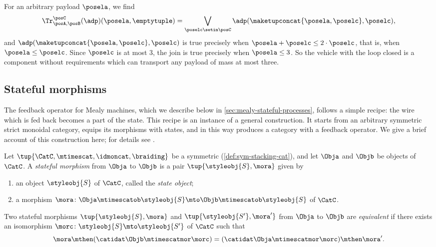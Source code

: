 \begin{example}
    For an arbitrary payload $\posela$, we find
    \begin{equation}
        \Tr_{\posA,\posB}^{\posC}(\adp)(\posela, \emptytuple)
        = \bigvee_{\poselc \setin \posC} \adp(\maketupconcat{\posela, \poselc}, \poselc),
    \end{equation}
    and $\adp(\maketupconcat{\posela, \poselc}, \poselc)$ is true precisely when $\posela + \poselc \leq 2 \cdot \poselc$, that is, when $\posela \leq \poselc$.
    Since $\poselc$ is at most $3$, the join is true precisely when $\posela \leq 3$.
    So the vehicle with the loop closed is a component without requirements which can transport any payload of mass at most three.
\end{example}


\subsection{Stateful morphisms}
\label{sec:stateful-processes}

The feedback operator for Mealy machines, which we describe below in \cref{sec:mealy-stateful-processes}, follows a simple recipe: the wire which is fed back becomes a part of the state.
This recipe is an instance of a general construction.
It starts from an arbitrary symmetric strict monoidal category, equips its morphisms with states, and in this way produces a category with a feedback operator.
We give a brief account of this construction here; for details see \cite{katis2002feedback,dilavore2020canonical}.

\begin{ctdefinition}
    \label{def:stateful-process}
    Let $\tup{\CatC, \mtimescat, \idmoncat, \braiding}$ be a symmetric  (\cref{def:sym-stacking-cat}), and let $\Obja$ and $\Objb$ be objects of $\CatC$.
    A \emph{stateful morphism} from $\Obja$ to $\Objb$ is a pair $\tup{\styleobj{S}, \mora}$ given by

    \constit
    \begin{enumerate}
        \item an object $\styleobj{S}$ of $\CatC$, called the \emph{state object};
        \item a morphism $\mora \colon \Obja \mtimescatob \styleobj{S} \mto \Objb \mtimescatob \styleobj{S}$ of $\CatC$.
    \end{enumerate}
    Two stateful morphisms $\tup{\styleobj{S}, \mora}$ and $\tup{\styleobj{S'}, \mora'}$ from $\Obja$ to $\Objb$ are \emph{equivalent} if there exists an isomorphism $\morc \colon \styleobj{S} \mto \styleobj{S'}$ of $\CatC$ such that
    \begin{equation}
        \label{eq:stateful-process-equivalence}
        \mora \mthen (\catidat\Objb \mtimescatmor \morc) = (\catidat\Obja \mtimescatmor \morc) \mthen \mora'.
    \end{equation}
\end{ctdefinition}

